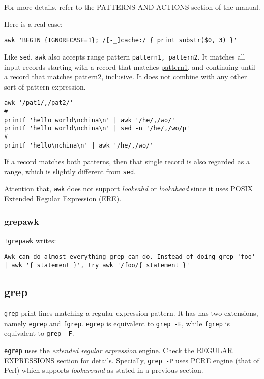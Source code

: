 For more details, refer to the PATTERNS AND ACTIONS section of the
manual.

Here is a real case:

\begin{lstlisting}
awk 'BEGIN {IGNORECASE=1}; /[-_]cache:/ { print substr($0, 3) }'
\end{lstlisting}

Like \lstinline|sed|, \lstinline|awk| also accepts range pattern
\verb|pattern1, pattern2|. It matches all input records starting
with a record that matches \uline{pattern1}, and continuing until
a record that matches \uline{pattern2}, inclusive. It does not
combine with any other sort of pattern expression.

\begin{lstlisting}
awk '/pat1/,/pat2/'
#
printf 'hello world\nchina\n' | awk '/he/,/wo/'
printf 'hello world\nchina\n' | sed -n '/he/,/wo/p'
#
printf 'hello\nchina\n' | awk '/he/,/wo/'
\end{lstlisting}

If a record matches both patterns, then that single record is also regarded as
a range, which is slightly different from \lstinline|sed|.

Attention that, \lstinline|awk| does not support \textit{lookeahd}
or \textit{lookahead} since it uses POSIX Extended Regular
Expression (ERE).

\subsubsection{grepawk}
\label{sec:grepawk}

\verb|!grepawk| writes:

\begin{lstlisting}
Awk can do almost everything grep can do. Instead of doing grep 'foo' | awk '{ statement }', try awk '/foo/{ statement }'
\end{lstlisting}

\subsection{grep}
\label{sec:bash-grep}

\lstinline|grep| print lines matching a regular expression
pattern. It has has two extensions, namely \lstinline|egrep| and
\lstinline|fgrep|. \lstinline|egrep| is equivalent to
\lstinline|grep -E|, while \lstinline|fgrep| is equivalent to
\lstinline|grep -F|.

\lstinline|egrep| uses the \textit{extended regular expression}
engine. Check the \uline{REGULAR EXPRESSIONS} section for
details. Specially, \lstinline|grep -P| uses PCRE engine (that of
Perl) which supports \textit{lookaround} as stated in a previous
section.


